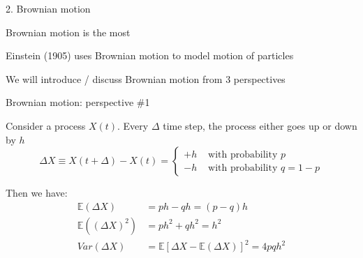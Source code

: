 \documentclass[11pt, aspectratio=169]{beamer}
\newenvironment{witemize}{\itemize\addtolength{\itemsep}{10pt}}{\enditemize}
\begin{document}
\begin{frame}{2. Brownian motion}
\begin{witemize}
\item Brownian motion is the most  

\item Einstein (1905) uses Brownian motion to model motion of particles

\item We will introduce / discuss Brownian motion from 3 perspectives
\end{witemize}
\end{frame}


\begin{frame}{Brownian motion: perspective \#1}
\begin{witemize}
\item Consider a process $X(t)$. Every $\Delta$ time step, the process either goes up or down by $h$
\begin{equation*}
	\Delta X \equiv X(t+\Delta) - X(t) = 
	\begin{cases}
		+ h & \text{ with probability } p \\
		- h & \text{ with probability } q = 1-p
	\end{cases}
\end{equation*}

\item Then we have:
\begin{align*}
	\mathbb E(\Delta X) &= ph - qh = (p-q)h \\
	\mathbb E((\Delta X)^2) &= ph^2 + qh^2 = h^2 \\
	Var(\Delta X) &= \mathbb E[ \Delta X - \mathbb E (\Delta X)]^2 = 4 pq h^2
\end{align*}

\end{witemize}
\end{frame}
\end{document}
